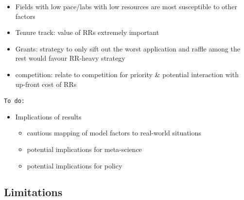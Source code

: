 \documentclass[
  ,man,mask,floatsintext]{apa6}
\providecommand{\tightlist}{%
  \setlength{\itemsep}{0pt}\setlength{\parskip}{0pt}}
\begin{document}
\begin{itemize}
\tightlist
\item
  Fields with low pace/labs with low resources are most susceptible to other factors
\item
  Tenure track: value of RRs extremely important
\item
  Grants: strategy to only sift out the worst application and raffle among the rest would favour RR-heavy strategy
\item
  competition: relate to competition for priority \& potential interaction with up-front cost of RRs
\end{itemize}

\texttt{To\ do:}

\begin{itemize}
\tightlist
\item
  Implications of results

  \begin{itemize}
  \tightlist
  \item
    cautious mapping of model factors to real-world situations
  \item
    potential implications for meta-science
  \item
    potential implications for policy
  \end{itemize}
\end{itemize}

\hypertarget{limitations}{%
\subsection{Limitations}\label{limitations}}
\end{document}
